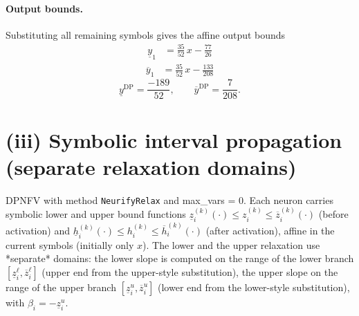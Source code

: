 \documentclass[11pt]{article}
\begin{document}
\paragraph{Output bounds.}
Substituting all remaining symbols gives the affine output bounds
\begin{align*}
\underline{y}_{1} &= \frac{35}{52}\,x - \frac{77}{26}
\end{align*}
\begin{align*}
\overline{y}_{1} &= \frac{35}{52}\,x - \frac{133}{208}
\end{align*}
\begin{equation*}
\underline{y}^{\text{DP}} = \frac{-189}{52}, \qquad \overline{y}^{\text{DP}} = \frac{7}{208}.
\end{equation*}

\section{(iii) Symbolic interval propagation (separate relaxation domains)}
DPNFV with method \texttt{NeurifyRelax} and max\_vars = 0. Each neuron carries symbolic lower and upper bound functions
$\underline{z}^{(k)}_i(\cdot) \le z^{(k)}_i \le \overline{z}^{(k)}_i(\cdot)$ (before activation)
and $\underline{h}^{(k)}_i(\cdot) \le h^{(k)}_i \le \overline{h}^{(k)}_i(\cdot)$ (after activation),
affine in the current symbols (initially only $x$).
The lower and the upper relaxation use *separate* domains:
the lower slope is computed on the range of the lower branch
$[\underline{z}^{\ell}_i, \overline{z}^{\ell}_i]$ (upper end from the upper-style substitution),
the upper slope on the range of the upper branch
$[\underline{z}^{u}_i, \overline{z}^{u}_i]$ (lower end from the lower-style substitution),
with $\beta_i = -\underline{z}^{u}_i$.
\end{document}
